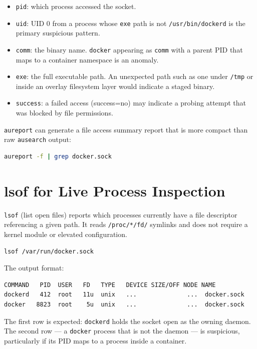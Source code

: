 \begin{itemize}
    \item \texttt{pid}: which process accessed the socket.
    \item \texttt{uid}: UID 0 from a process whose \texttt{exe} path is not \texttt{/usr/bin/dockerd} is the primary suspicious pattern.
    \item \texttt{comm}: the binary name. \texttt{docker} appearing as \texttt{comm} with a parent PID that maps to a container namespace is an anomaly.
    \item \texttt{exe}: the full executable path. An unexpected path such as one under \texttt{/tmp} or inside an overlay filesystem layer would indicate a staged binary.
    \item \texttt{success}: a failed access (success=no) may indicate a probing attempt that was blocked by file permissions.
\end{itemize}

\texttt{aureport} can generate a file access summary report that is more compact than raw \texttt{ausearch} output:

\begin{lstlisting}[language=bash]
aureport -f | grep docker.sock
\end{lstlisting}


\section{lsof for Live Process Inspection}

\texttt{lsof} (list open files) reports which processes currently have a file descriptor referencing a given path. It reads \texttt{/proc/*/fd/} symlinks and does not require a kernel module or elevated configuration.

\begin{lstlisting}[language=bash]
lsof /var/run/docker.sock
\end{lstlisting}

The output format:

\begin{lstlisting}
COMMAND   PID  USER   FD   TYPE   DEVICE SIZE/OFF NODE NAME
dockerd   412  root   11u  unix   ...              ...  docker.sock
docker   8823  root    5u  unix   ...              ...  docker.sock
\end{lstlisting}

The first row is expected: \texttt{dockerd} holds the socket open as the owning daemon. The second row --- a \texttt{docker} process that is not the daemon --- is suspicious, particularly if its PID maps to a process inside a container.

